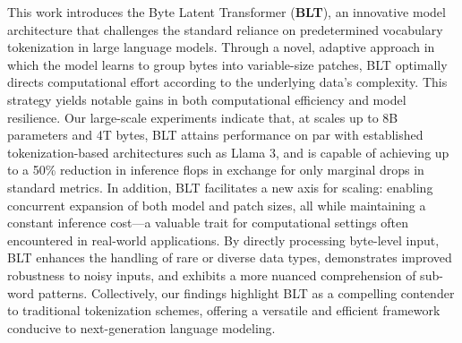 This work introduces the Byte Latent Transformer (\textbf{BLT}), an innovative model architecture that challenges the standard reliance on predetermined vocabulary tokenization in large language models. Through a novel, adaptive approach in which the model learns to group bytes into variable-size patches, {\textsc BLT} optimally directs computational effort according to the underlying data’s complexity. This strategy yields notable gains in both computational efficiency and model resilience. Our large-scale experiments indicate that, at scales up to 8B parameters and 4T bytes, {\textsc BLT} attains performance on par with established tokenization-based architectures such as Llama 3, and is capable of achieving up to a 50\% reduction in inference flops in exchange for only marginal drops in standard metrics. In addition, {\textsc BLT} facilitates a new axis for scaling: enabling concurrent expansion of both model and patch sizes, all while maintaining a constant inference cost—a valuable trait for computational settings often encountered in real-world applications. By directly processing byte-level input, {\textsc BLT} enhances the handling of rare or diverse data types, demonstrates improved robustness to noisy inputs, and exhibits a more nuanced comprehension of sub-word patterns. Collectively, our findings highlight {\textsc BLT} as a compelling contender to traditional tokenization schemes, offering a versatile and efficient framework conducive to next-generation language modeling.

